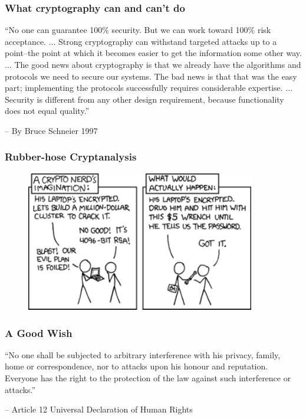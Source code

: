 \begin{frame}\frametitle{What cryptography can and can't do}
``No one can guarantee 100\% security. But we can work toward 100\% risk acceptance. $\dots$ Strong cryptography can withstand targeted attacks up to a point--the point at which it becomes easier to get the information some other way. $\dots$ The good news about cryptography is that we already have the algorithms and protocols we need to secure our systems. The bad news is that that was the easy part; implementing the protocols successfully requires considerable expertise. $\dots$  
Security is different from any other design requirement, because functionality does not equal quality.''
\newline

-- By Bruce Schneier 1997
\end{frame}
\begin{frame}\frametitle{Rubber-hose Cryptanalysis}
\begin{figure}
\begin{center}
\includegraphics[width=100mm]{pic/rubberhose} 
\end{center}
\end{figure}
\end{frame}
\begin{frame}\frametitle{A Good Wish}
``No one shall be subjected to arbitrary interference with his privacy, family, home or correspondence, nor to attacks upon his honour and reputation. Everyone has the right to the protection of the law against such interference or attacks.''
\newline

-- Article 12 Universal Declaration of Human Rights
\end{frame}


